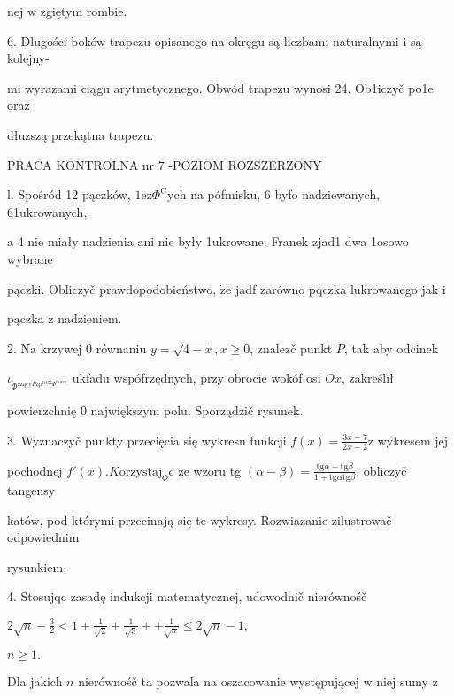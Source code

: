 \documentclass[a4paper,12pt]{article}
\begin{document}
nej $\mathrm{w}$ zgiętym rombie.

6. Dlugości boków trapezu opisanego na okręgu są liczbami naturalnymi $\mathrm{i}$ są kolejny-

mi wyrazami ciągu arytmetycznego. Obwód trapezu wynosi 24. Ob1iczyč po1e oraz

dłuzszą przekątna trapezu.




PRACA KONTROLNA nr 7 -POZIOM ROZSZERZONY

l. Spośród 12 pączków, $1\mathrm{e}\mathrm{z}\Phi^{\mathrm{C}}\mathrm{y}\mathrm{c}\mathrm{h}$ na pófmisku, 6 byfo nadziewanych, 61ukrowanych,

a 4 nie miały nadzienia ani nie były 1ukrowane. Franek zjad1 dwa 1osowo wybrane

pączki. Obliczyč prawdopodobieństwo, $\dot{\mathrm{z}}\mathrm{e}$ jadf zarówno pqczka lukrowanego jak $\mathrm{i}$

pączka $\mathrm{z}$ nadzieniem.

2. Na krzywej $0$ równaniu $y = \sqrt{4-x}, x \geq 0$, znalez$\acute{}$č punkt $P$, tak aby odcinek

$\iota_{\Phi^{\mathrm{c}\mathrm{z}\text{ą} \mathrm{c}\mathrm{y}P\mathrm{z}\mathrm{p}^{\mathrm{O}\mathrm{C}\mathrm{Z}}\Phi^{\mathrm{t}\mathrm{k}\mathrm{i}\mathrm{e}\mathrm{m}}}}$ ukfadu wspófrzędnych, przy obrocie wokóf osi $Ox$, zakreślił

powierzchnię $0$ największym polu. Sporządzič rysunek.

3. Wyznaczyč punkty przecięcia się wykresu funkcji $f(x) = \displaystyle \frac{3x-7}{2x-2} \mathrm{z}$ wykresem jej

pochodnej $f'(x). K\mathrm{o}\mathrm{r}\mathrm{z}\mathrm{y}\mathrm{s}\mathrm{t}\mathrm{a}\mathrm{j}_{\Phi}\mathrm{c}$ ze wzoru tg $(\displaystyle \alpha-\beta)=\frac{\mathrm{t}\mathrm{g}\alpha-\mathrm{t}\mathrm{g}\beta}{1+\mathrm{t}\mathrm{g}\alpha \mathrm{t}\mathrm{g}\beta}$, obliczyč tangensy

katów, pod którymi przecinają się te wykresy. Rozwiazanie zilustrowač odpowiednim

rysunkiem.

4. Stosujqc zasadę indukcji matematycznej, udowodnič nierównośč

$2\displaystyle \sqrt{n}-\frac{3}{2}<1+\frac{1}{\sqrt{2}}+\frac{1}{\sqrt{3}}+ +\displaystyle \frac{1}{\sqrt{n}}\leq 2\sqrt{n}-1,$

$n\geq 1.$

Dla jakich $n$ nierównośč ta pozwala na oszacowanie występującej $\mathrm{w}$ niej sumy $\mathrm{z}$
\end{document}
